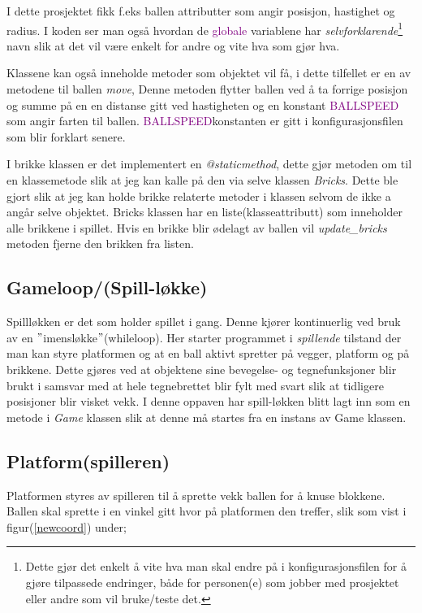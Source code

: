 \documentclass{article}     %
\begin{document}
I dette prosjektet fikk f.eks ballen attributter som angir posisjon, hastighet og radius. I koden ser man også hvordan de \textcolor{purple}{globale} variablene har \emph{selvforklarende}\footnote{Dette gjør det enkelt å vite hva man skal endre på i konfigurasjonsfilen for å gjøre tilpassede endringer, både for personen(e) som jobber med prosjektet eller andre som vil bruke/teste det.} navn slik at det vil være enkelt for andre og vite hva som gjør hva.

Klassene kan også inneholde metoder som objektet vil få, i dette tilfellet er en av metodene til ballen \emph{move},
Denne metoden flytter ballen ved å ta forrige posisjon og summe på en en distanse gitt ved hastigheten og en konstant \textcolor{purple}{BALLSPEED} som angir farten til ballen. \textcolor{purple}{BALLSPEED}konstanten er gitt i konfigurasjonsfilen som blir forklart senere.

I brikke klassen er det implementert en \emph{@staticmethod}, dette gjør metoden om til en klassemetode slik at jeg kan kalle på den via selve klassen \emph{Bricks}. Dette ble gjort slik at jeg kan holde brikke relaterte metoder i klassen selvom de ikke a angår selve objektet.
Bricks klassen har en liste(klasseattributt) som inneholder alle brikkene i spillet. Hvis en brikke blir ødelagt av ballen vil \emph{update\_bricks} metoden fjerne den brikken fra listen.




\subsection{Gameloop/(Spill-løkke)}\label{Gameloop}

Spillløkken er det som holder spillet i gang. Denne kjører kontinuerlig ved bruk av en $"$imensløkke$"$(whileloop).
Her starter programmet i \emph{spillende} tilstand der man kan styre platformen og at en ball aktivt spretter på vegger, platform og på brikkene. Dette gjøres ved at objektene sine bevegelse- og tegnefunksjoner blir brukt i samsvar med at hele tegnebrettet blir fylt med svart slik at tidligere posisjoner blir visket vekk.
I denne oppaven har spill-løkken blitt lagt inn som en metode i \emph{Game} klassen slik at denne må startes fra en instans av Game klassen.



\subsection{Platform(spilleren)}
Platformen styres av spilleren til å sprette vekk ballen for å knuse blokkene. Ballen skal sprette i en vinkel gitt hvor på platformen den treffer, slik som vist i figur(\ref{newcoord}) under;
\end{document}
